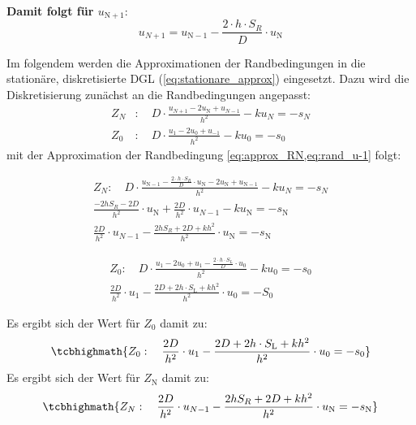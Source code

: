 \begin{qed}
	\textbf{Damit folgt für $u_{\mathrm{N}+1}$}:
	\begin{equation}\label{eq:approx_RN}
		u_{N+1} =u_{\mathrm{N}-1} -\frac{2\cdot h\cdot S_R}{D} \cdot
		u_\mathrm{N}
	\end{equation}
\end{qed}

Im folgendem werden die Approximationen der Randbedingungen in die stationäre,
diskretisierte DGL (\cref{eq:stationare_approx}) eingesetzt. Dazu wird die
Diskretisierung zunächst an die Randbedingungen angepasst:
\begin{equation}
	\begin{split}
		Z_N&: \quad	D\cdot
		\frac{u_{N+1}-2u_\mathrm{N}+u_{N-1}}{h^2}-ku_N=-s_N \\
		Z_0&: \quad D\cdot \frac{u_{1}-2u_0+u_{-1}}{h^2}-ku_0=-s_0
	\end{split}
\end{equation}
mit der Approximation der Randbedingung \cref{eq:approx_RN,eq:rand_u-1} folgt:

\begin{equation}
	\begin{split}
		Z_N: \quad	D\cdot
		\frac{u_{\mathrm{N}-1}-\frac{2\cdot h\cdot S_R}{D} \cdot u_\mathrm{N}
		-2u_\mathrm{N}+u_{\mathrm{N}-1}}{h^2}-ku_N=-s_N \\
		\frac{-2hS_R-2D}{h^2}\cdot
		u_\mathrm{N}+\frac{2D}{h^2}\cdot u_{N-1}-ku_\mathrm{N}=-s_\mathrm{N}\\
		\frac{2D}{h^2}\cdot
		u_{N-1}-\frac{2hS_R+2D+kh^2}{h^2}\cdot u_\mathrm{N}=-s_\mathrm{N}
	\end{split}
\end{equation}

\begin{equation}
	\begin{split}
		Z_0: \quad	D\cdot \frac{u_1-2u_0+u_1-\frac{2\cdot h\cdot
				S_L}{D} \cdot u_0 }{h^2}-ku_0=-s_0\\
		\frac{2D}{h^2}\cdot u_1 - \frac{2D+2h\cdot
			S_\mathrm{L}+kh^2}{h^2}\cdot u_0=-S_0
	\end{split}
\end{equation}

\begin{qed}
	Es ergibt sich der Wert für $Z_0$ damit zu:
	\begin{equation}
		\tcbhighmath{Z_0: \quad \frac{2D}{h^2}\cdot u_1 -
			\frac{2D+2h\cdot S_\mathrm{L}+kh^2}{h^2}\cdot u_0=-s_0}
	\end{equation}
	Es ergibt sich der Wert für $Z_\mathrm{N}$ damit zu:
	\begin{equation}
		\tcbhighmath{Z_N: \quad \frac{2D}{h^2}\cdot
			u_{N-1}-\frac{2hS_R+2D+kh^2}{h^2}\cdot u_\mathrm{N}=-s_\mathrm{N}}
	\end{equation}

\end{qed}

